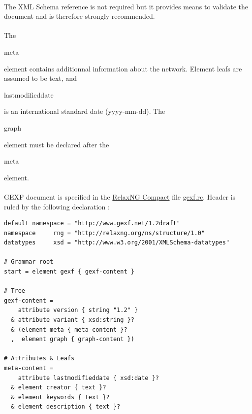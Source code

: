 \documentclass[a4paper,10pt]{article}
\begin{document}
\paragraph{}
The XML Schema reference is not required but it provides means to validate the document and is therefore strongly recommended.

\paragraph{}
The \begin{footnotesize}meta\end{footnotesize} element contains additionnal information about the network. Element leafs are assumed to be text, and \begin{footnotesize}lastmodifieddate\end{footnotesize} is an international standard date (yyyy-mm-dd). The \begin{footnotesize}graph\end{footnotesize} element must be declared after the \begin{footnotesize}meta\end{footnotesize} element.

\paragraph{}
GEXF document is specified in the \href{http://relaxng.org/compact-tutorial-20030326.html}{RelaxNG Compact} file \href{http://www.gexf.net/1.2draft/gexf.rnc}{gexf.rc}. Header is ruled by the following declaration :

\lstset{ style=rnc }
\begin{lstlisting}[caption={Header Specification},label=headerRNC]
default namespace = "http://www.gexf.net/1.2draft"
namespace     rng = "http://relaxng.org/ns/structure/1.0"
datatypes     xsd = "http://www.w3.org/2001/XMLSchema-datatypes"

# Grammar root
start = element gexf { gexf-content }

# Tree
gexf-content =
    attribute version { string "1.2" }
  & attribute variant { xsd:string }?
  & (element meta { meta-content }?
  ,  element graph { graph-content })

# Attributes & Leafs
meta-content =
    attribute lastmodifieddate { xsd:date }?
  & element creator { text }?
  & element keywords { text }?
  & element description { text }?
\end{lstlisting}
\end{document}
